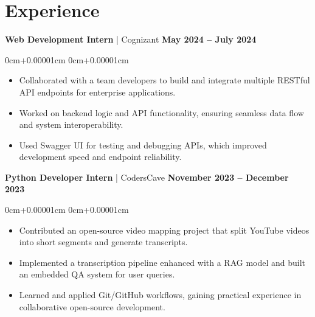 \documentclass[10pt,a4paper]{article}
\newenvironment{highlights}{
    \begin{itemize}[
        topsep=0.10cm,
        parsep=0.10cm,
        partopsep=0pt,
        itemsep=0pt,
        leftmargin=10pt,
    ]
    }{
    \end{itemize}
}
\newenvironment{onecolentry}{
    \begin{adjustwidth}{
        0cm+0.00001cm
    }{
        0cm+0.00001cm
    }
    }{
    \end{adjustwidth}
}
\begin{document}
    \section{Experience}\label{sec:experience}

    \textbf{Web Development Intern} | Cognizant \hfill \textbf{May 2024 – July 2024}
    \begin{onecolentry}
        \begin{highlights}
            \vspace{0.01cm}
            \item Collaborated with a team developers to build and integrate multiple RESTful API endpoints for enterprise applications.
            \item Worked on backend logic and API functionality, ensuring seamless data flow and system interoperability.
            \item Used Swagger UI for testing and debugging APIs, which improved development speed and endpoint reliability.
        \end{highlights}
    \end{onecolentry}
    \vspace{0.1cm}
    \textbf{Python Developer Intern} | CodersCave \hfill \textbf{November 2023 – December 2023}
    \begin{onecolentry}
        \begin{highlights}
            \vspace{0.01cm}
            \item Contributed an open-source video mapping project that split YouTube videos into short segments and generate transcripts.
            \item Implemented a transcription pipeline enhanced with a RAG model and built an embedded QA system for user queries.
            \item Learned and applied Git/GitHub workflows, gaining practical experience in collaborative open-source development.
        \end{highlights}
    \end{onecolentry}
\end{document}
